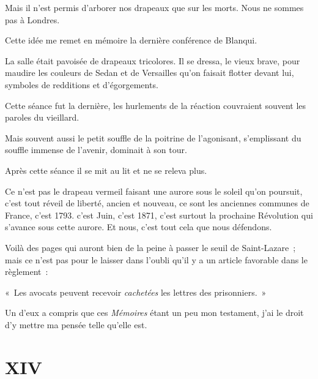 \documentclass[french,twoside]{book} %
\newcommand\chapteropen{} %
\newcommand\chapterclose{} %
\begin{document}
Mais il n’est permis d’arborer nos drapeaux que sur les morts. Nous ne sommes pas à Londres.\par
 Cette idée me remet en mémoire la dernière conférence de Blanqui.\par
La salle était pavoisée de drapeaux tricolores. Il se dressa, le vieux brave, pour maudire les couleurs de Sedan et de Versailles qu’on faisait flotter devant lui, symboles de redditions et d’égorgements.\par
Cette séance fut la dernière, les hurlements de la réaction couvraient souvent les paroles du vieillard.\par
Mais souvent aussi le petit souffle de la poitrine de l’agonisant, s’emplissant du souffle immense de l’avenir, dominait à son tour.\par
Après cette séance il se mit au lit et ne se releva plus.\par
Ce n’est pas le drapeau vermeil faisant une aurore sous le soleil qu’on poursuit, c’est tout réveil de liberté, ancien et nouveau, ce sont les anciennes communes de France, c’est 1793. c’est Juin, c’est 1871, c’est surtout la prochaine Révolution qui s’avance sous cette aurore. Et nous, c’est tout cela que nous défendons.\par
\bigbreak
\noindent Voilà des pages qui auront bien de la peine à passer le seuil de Saint-Lazare ; mais ce n’est pas pour le laisser dans l’oubli qu’il y a un article favorable dans le règlement :\par
 « Les avocats peuvent recevoir \emph{cachetées} les lettres des prisonniers. »\par
Un d’eux a compris que ces \emph{Mémoires} étant un peu mon testament, j’ai le droit d’y mettre ma pensée telle qu’elle est.
\chapterclose


\chapteropen
 \chapter[{XIV}]{XIV}
\label{p2.14}
\end{document}
